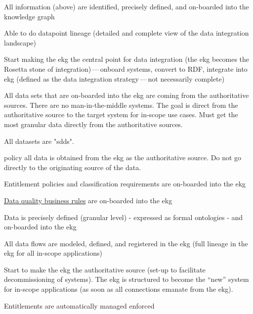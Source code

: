 \begin{scoring}

    \item All information (above) are identified, precisely defined, and on-boarded into the knowledge graph
    \item Able to do datapoint lineage (detailed and complete view of the data integration landscape)
    \item Start making the \gls{ekg} the central point for data integration (the \gls{ekg} becomes the Rosetta stone of
          integration)\,---\,onboard systems, convert to RDF, integrate into \gls{ekg} (defined as the
          data integration strategy\,---\,not necessarily complete)
    \item All data sets that are on-boarded into the \gls{ekg} are coming from the authoritative sources.
          There are no man-in-the-middle systems.
          The goal is direct from the authoritative source to the target system for in-scope use cases.
          Must get the most granular data directly from the authoritative sources.
    \item All datasets are "\glspl{sdd}".
    \item [policy] all data is obtained from the \gls{ekg} as the authoritative source.
          Do not go directly to the originating source of the data.
    \item Entitlement policies and classification requirements are on-boarded into the \gls{ekg}
    \item \hyperref[sec:ekg-mm-data-quality-business-rules]{Data quality business rules}
          are on-boarded into the \gls{ekg}

\end{scoring}

\ekgmmscoringlevelThree

\begin{scoring}

    \item Data is precisely defined (granular level) - expressed as formal ontologies - and on-boarded into the \gls{ekg}
    \item All data flows are modeled, defined, and registered in the \gls{ekg} (full lineage in the \gls{ekg} for all
          in-scope applications)
    \item Start to make the \gls{ekg} the authoritative source (set-up to facilitate decommissioning of systems).
          The \gls{ekg} is structured to become the “new” system for in-scope applications (as soon as all
          connections emanate from the \gls{ekg}).
    \item Entitlements are automatically managed enforced

\end{scoring}

